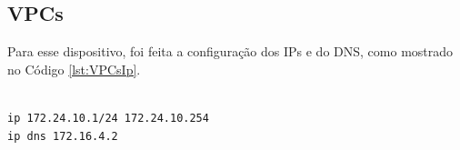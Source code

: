 \subsection{VPCs}
Para esse dispositivo, foi feita a configuração dos IPs e do DNS, como mostrado no Código \ref{lst:VPCsIp}.

\begin{listing}[H]
\centering
\begin{verbatim}

ip 172.24.10.1/24 172.24.10.254
ip dns 172.16.4.2

\end{verbatim}
\caption{Configuração do IP - VPCs}
\label{lst:VPCsIp}
\end{listing}
